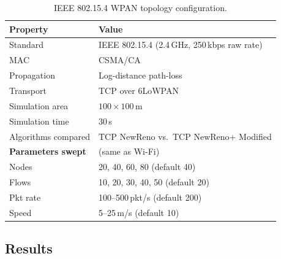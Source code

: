 \documentclass[12pt,a4paper]{article}
\begin{document}
\begin{table}[H]
\centering
\renewcommand{\arraystretch}{1.25}
\begin{tabular}{@{}ll@{}}
\toprule
\textbf{Property} & \textbf{Value} \\
\midrule
Standard        & IEEE 802.15.4 (2.4\,GHz, 250\,kbps raw rate) \\
MAC             & CSMA/CA \\
Propagation     & Log-distance path-loss \\
Transport       & TCP over 6LoWPAN \\
Simulation area & $100\times100$\,m \\
Simulation time & 30\,s \\
Algorithms compared & TCP NewReno vs.\ TCP NewReno+ Modified \\
\midrule
\textbf{Parameters swept} & (same as Wi-Fi) \\
Nodes     & 20, 40, 60, 80 (default 40) \\
Flows     & 10, 20, 30, 40, 50 (default 20) \\
Pkt rate  & 100–500\,pkt/s (default 200) \\
Speed     & 5–25\,m/s (default 10) \\
\bottomrule
\end{tabular}
\caption{IEEE 802.15.4 WPAN topology configuration.}
\end{table}

\subsection{Results}

\begin{table}[H]
\centering
\caption{Simulation results for IEEE 802.15.4 WPAN topology (varying number of nodes). Default parameters: 20 flows, 200 pkt/s, 10 m/s.}
\label{tab:wpan-results-data}
\renewcommand{\arraystretch}{1.3}
\end{table}
\end{document}
